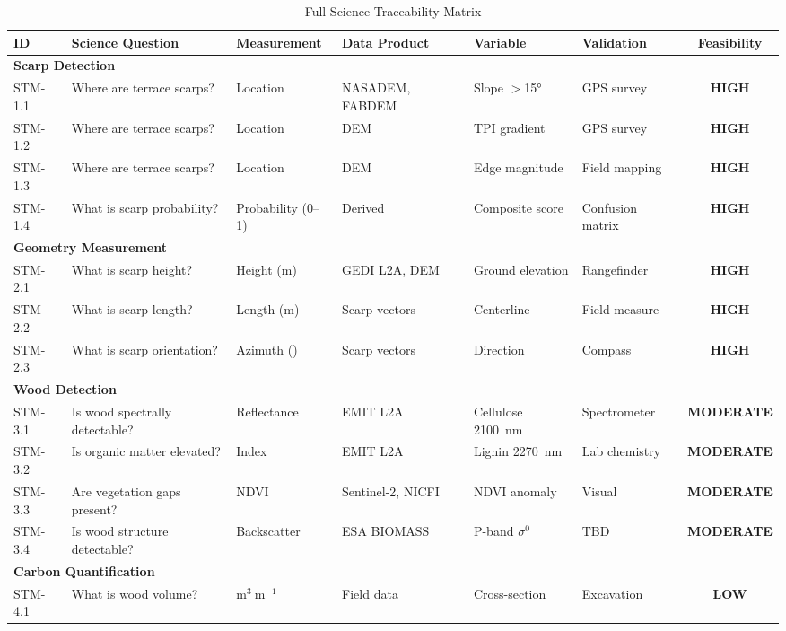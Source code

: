 \documentclass[11pt,letterpaper]{article}
\newcommand{\HIGH}{\textcolor{high}{\textbf{HIGH}}}
\newcommand{\MODERATE}{\textcolor{moderate}{\textbf{MODERATE}}}
\newcommand{\LOW}{\textcolor{low}{\textbf{LOW}}}
\newcommand{\unit}[1]{\ensuremath{\mathrm{#1}}}
\begin{document}
\begin{landscape}
\begin{table}[p]
\centering
\caption{Full Science Traceability Matrix}
\label{tab:stm_full}
\small
\begin{tabular}{p{1.5cm}p{4cm}p{2.5cm}p{2.5cm}p{3cm}p{2cm}c}
\toprule
\textbf{ID} & \textbf{Science Question} & \textbf{Measurement} & \textbf{Data Product} & \textbf{Variable} & \textbf{Validation} & \textbf{Feasibility} \\
\midrule
\multicolumn{7}{l}{\textbf{Scarp Detection}} \\
STM-1.1 & Where are terrace scarps? & Location & NASADEM, FABDEM & Slope $>$\ang{15} & GPS survey & \HIGH \\
STM-1.2 & Where are terrace scarps? & Location & DEM & TPI gradient & GPS survey & \HIGH \\
STM-1.3 & Where are terrace scarps? & Location & DEM & Edge magnitude & Field mapping & \HIGH \\
STM-1.4 & What is scarp probability? & Probability (0--1) & Derived & Composite score & Confusion matrix & \HIGH \\
\midrule
\multicolumn{7}{l}{\textbf{Geometry Measurement}} \\
STM-2.1 & What is scarp height? & Height (m) & GEDI L2A, DEM & Ground elevation & Rangefinder & \HIGH \\
STM-2.2 & What is scarp length? & Length (m) & Scarp vectors & Centerline & Field measure & \HIGH \\
STM-2.3 & What is scarp orientation? & Azimuth (\ang{}) & Scarp vectors & Direction & Compass & \HIGH \\
\midrule
\multicolumn{7}{l}{\textbf{Wood Detection}} \\
STM-3.1 & Is wood spectrally detectable? & Reflectance & EMIT L2A & Cellulose \SI{2100}{nm} & Spectrometer & \MODERATE \\
STM-3.2 & Is organic matter elevated? & Index & EMIT L2A & Lignin \SI{2270}{nm} & Lab chemistry & \MODERATE \\
STM-3.3 & Are vegetation gaps present? & NDVI & Sentinel-2, NICFI & NDVI anomaly & Visual & \MODERATE \\
STM-3.4 & Is wood structure detectable? & Backscatter & ESA BIOMASS & P-band $\sigma^0$ & TBD & \MODERATE \\
\midrule
\multicolumn{7}{l}{\textbf{Carbon Quantification}} \\
STM-4.1 & What is wood volume? & \unit{m^3~m^{-1}} & Field data & Cross-section & Excavation & \LOW \\

\end{tabular}
\end{table}
\end{landscape}
\end{document}
